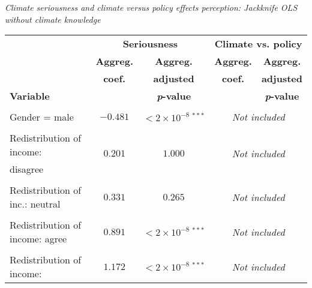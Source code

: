 \documentclass[a4paper,12pt]{article}
\begin{document}
{\centering
\begin{threeparttable}
\caption{\textit{{Climate seriousness and climate versus policy effects perception:} Jackknife OLS without climate knowledge}}
\label{ClimCare435eClimpol435f} 
\centering
\begin{small}
\vspace{-1.2cm}
\begin{tabular}{lcccc} 
\hline
  \multicolumn{1}{l}{}&\multicolumn{2}{c}{\textbf{Seriousness}}&\multicolumn{2}{c}{\textbf{Climate vs. policy}}\\
\cmidrule(lr){2-3} \cmidrule(lr){4-5}
  \multicolumn{1}{l}{} & \multicolumn{1}{c}{\textbf{Aggreg.}}& \multicolumn{1}{c}{\textbf{Aggreg.}}& \multicolumn{1}{c}{\textbf{Aggreg.}} &  \multicolumn{1}{c}{\textbf{Aggreg.}} \\
    \multicolumn{1}{l}{} & \multicolumn{1}{c}{\textbf{coef.}}& \multicolumn{1}{c}{\textbf{adjusted}}& \multicolumn{1}{c}{\textbf{coef.}} &  \multicolumn{1}{c}{\textbf{adjusted}} \\
        \multicolumn{1}{l}{\textbf{Variable}}&\multicolumn{1}{c}{}& \multicolumn{1}{c}{\textbf{\textit{p}-value}}&\multicolumn{1}{c}{} &  \multicolumn{1}{c}{\textbf{\textit{p}-value}}\\
 \hline 
\vspace{-0.23cm}
\\
\vspace{-0.2cm}Gender = male&$-0.481$&$<2\times10^{-8}~^{***}$&\multicolumn{2}{c}{\textit{Not included}}\\
\\
 Redistribution of income:&\multirow{2}{*}{$0.201$}&\multirow{2}{*}{$1.000$}&  \multicolumn{2}{c}{\multirow{2}{*}{\textit{Not included}}} \\%
    \vspace{-0.2cm}   \hspace{0.6cm}disagree\tnote{a}&&&&\\%
    \\
  \vspace{-0.2cm}Redistribution of inc.: neutral\tnote{a}&$0.331$&$0.265$ &\multicolumn{2}{c}{\textit{Not included}}\\%
    \\
  \vspace{-0.2cm}Redistribution of income: agree\tnote{a}&$0.891$&$<2\times10^{-8}~^{***}$&\multicolumn{2}{c}{\textit{Not included}}\\%
    \\
  Redistribution of income:& \multirow{2}{*}{$1.172$}&\multirow{2}{*}{$<2\times10^{-8}~^{***}$}& \multicolumn{2}{c}{\multirow{2}{*}{\textit{Not included}}} \\

\end{tabular}
\end{small}
\end{threeparttable}}
\end{document}
